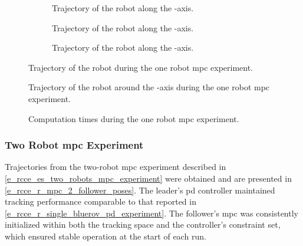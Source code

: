\begin{figure}
	\centering
	\begin{subfigure}{\figurewidth}
		\centering
		\caption{Trajectory of the robot along the -axis.}
		\label{e_rcce_r_mpc_pose_x}
	\end{subfigure}
	\begin{subfigure}{\figurewidth}
		\centering
		\caption{Trajectory of the robot along the -axis.}
		\label{e_rcce_r_mpc_pose_y}
	\end{subfigure}
	\begin{subfigure}{\figurewidth}
		\centering
		\caption{Trajectory of the robot along the -axis.}
		\label{e_rcce_r_mpc_pose_z}
	\end{subfigure}
	\caption{Trajectory of the robot during the one robot \ac{mpc} experiment.}
	\label{e_rcce_r_mpc_poses}
\end{figure}

\begin{figure}
	\centering
	\caption{Trajectory of the robot around the -axis during the one robot \ac{mpc} experiment.}
	\label{e_rcce_r_mpc_pose_wz}
\end{figure}

\begin{figure}
	\centering
	\caption{Computation times during the one robot \ac{mpc} experiment.}
	\label{e_rcce_r_mpc_compute_time}
\end{figure}

\subsubsection{Two Robot \acs{mpc} Experiment} \label{e_rcce_r_two_bluerov_mpc_experiment}

Trajectories from the two-robot \ac{mpc} experiment described in
\cref{e_rcce_es_two_robots_mpc_experiment} were obtained and are presented in
\cref{e_rcce_r_mpc_2_follower_poses}. The leader's \ac{pd} controller maintained tracking
performance comparable to that reported in \cref{e_rcce_r_single_bluerov_pd_experiment}. The
follower's \ac{mpc} was consistently initialized within both the tracking space and the
controller's constraint set, which ensured stable operation at the start of each run.

